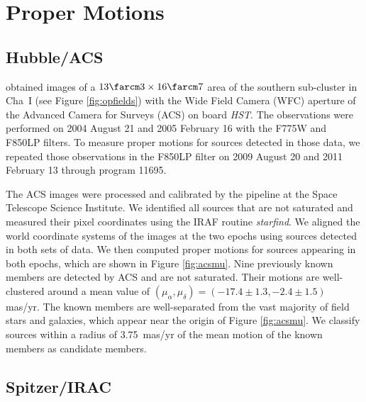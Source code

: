 \documentclass{emulateapj}
\begin{document}
\section{Proper Motions}\label{sec:pm}

\subsection{Hubble/ACS}
\label{sec:acspm}

\cite{luh05} obtained images of a $13\farcm3 \times 16\farcm7$ area of the southern sub-cluster in Cha~I
(see Figure \ref{fig:opfields}) 
with the Wide Field Camera (WFC) aperture of the Advanced Camera for Surveys (ACS) on board {\it HST}.
The observations were performed on 2004 August 21 and 2005 February 16
with the F775W and F850LP filters. 
To measure proper motions for sources detected in those data,
we repeated those observations in the F850LP filter 
on 2009 August 20 and 2011 February 13 through program 11695.

The ACS images were processed and calibrated by the pipeline 
at the Space Telescope Science Institute.
We identified all sources that are not saturated
and measured their pixel coordinates using the IRAF routine {\it starfind}.
We aligned the world coordinate systems of the images at the two epochs 
using sources detected in both sets of data.
We then computed proper motions for sources appearing in both epochs,
which are shown in Figure \ref{fig:acsmu}.
Nine previously known members are detected by ACS and are not saturated. 
Their motions are well-clustered around a mean value of 
$(\mu_\alpha, \mu_\delta) = (-17.4 \pm 1.3, -2.4 \pm 1.5)$ mas/yr.
The known members are well-separated from the vast majority of field stars and galaxies,
which appear near the origin of Figure \ref{fig:acsmu}.
We classify sources within a radius of 3.75~mas/yr of the mean motion of the known members
as candidate members. 

\subsection{Spitzer/IRAC}
\label{sec:iracpm}
\end{document}
